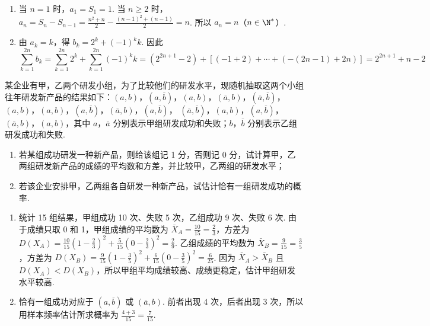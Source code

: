 \begin{solution}
\begin{enumerate}
\item 当 \(n=1\) 时，\(a_1=S_1=1\). 当 \(n\geqslant2\) 时，\(a_n=S_n-S_{n-1}=\frac{n^2+n}{2}-\frac{(n-1)^2+(n-1)}{2}=n\). 所以 \(a_n=n\)（\(n\in\N^*\)）.
\item 由 \(a_k=k\)，得 \(b_k=2^k+(-1)^k k\). 因此
\[\sum_{k=1}^{2n}b_k=\sum_{k=1}^{2n}2^k+\sum_{k=1}^{2n}(-1)^k k=(2^{2n+1}-2)+[(-1+2)+\cdots+(-(2n-1)+2n)]=2^{2n+1}+n-2\]
\end{enumerate}
\end{solution}

\begin{problem}
某企业有甲，乙两个研发小组，为了比较他们的研发水平，现随机抽取这两个小组往年研发新产品的结果如下：\((a, b)\)，\((a, \overline{b})\)，\((a, b)\)，\((\overline{a}, b)\)，\((\overline{a}, \overline{b})\)，
\((a, b)\)，\((a, b)\)，\((a, \overline{b})\)，\((\overline{a}, b)\)，\((a, \overline{b})\)，
\((\overline{a}, \overline{b})\)，\((a, b)\)，\((a, \overline{b})\)，\((\overline{a}, b)\)，\((a, b)\)，其中 \(a\)，\(\overline{a}\) 分别表示甲组研发成功和失败；\(b\)，\(\overline{b}\) 分别表示乙组研发成功和失败.

\begin{enumerate}
\item 若某组成功研发一种新产品，则给该组记 1 分，否则记 0 分，试计算甲，乙两组研发新产品的成绩的平均数和方差，并比较甲，乙两组的研发水平；
\item 若该企业安排甲，乙两组各自研发一种新产品，试估计恰有一组研发成功的概率.
\end{enumerate}
\end{problem}

\begin{solution}
\begin{enumerate}
\item 统计 15 组结果，甲组成功 10 次、失败 5 次，乙组成功 9 次、失败 6 次. 由于成绩只取 0 和 1，甲组成绩的平均数为 \(\bar X_A=\frac{10}{15}=\frac{2}{3}\)，方差为 \(D(X_A)=\frac{10}{15}\left(1-\frac23\right)^2+\frac{5}{15}\left(0-\frac23\right)^2=\frac29\). 乙组成绩的平均数为 \(\bar X_B=\frac{9}{15}=\frac{3}{5}\)，方差为 \(D(X_B)=\frac{9}{15}\left(1-\frac35\right)^2+\frac{6}{15}\left(0-\frac35\right)^2=\frac{6}{25}\). 因为 \(\bar X_A>\bar X_B\) 且 \(D(X_A)<D(X_B)\)，所以甲组平均成绩较高、成绩更稳定，估计甲组研发水平较高.
\item 恰有一组成功对应于 \((a,\overline b)\) 或 \((\overline a,b)\). 前者出现 4 次，后者出现 3 次，所以用样本频率估计所求概率为 \(\frac{4+3}{15}=\frac{7}{15}\).
\end{enumerate}
\end{solution}


